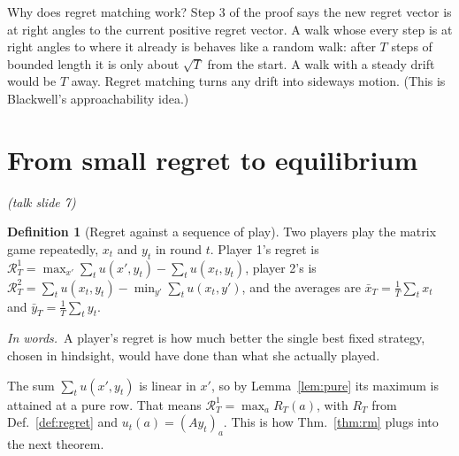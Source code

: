 \documentclass[11pt]{article}
\theoremstyle{definition}
\newtheorem{definition}{Definition}[section]
\newcommand{\inwords}{\par\smallskip\noindent\textit{In words.}\ }
\newcommand{\Def}[1]{Def.~\ref{#1}}\newcommand{\Lem}[1]{Lemma~\ref{#1}}\newcommand{\Thm}[1]{Thm.~\ref{#1}}
\newcommand{\slide}[1]{\hfill{\small\itshape (talk slide #1)}}
\begin{document}
\begin{intuition}
Why does regret matching work? Step 3 of the proof says the new regret vector is at right angles to the current positive
regret vector. A walk whose every step is at right angles to where it already is behaves like a random walk: after $T$
steps of bounded length it is only about $\sqrt T$ from the start. A walk with a steady drift would be $T$ away. Regret
matching turns any drift into sideways motion. (This is Blackwell's approachability idea.)
\end{intuition}

\section{From small regret to equilibrium}\label{sec:folk}\slide{7}
\begin{definition}[Regret against a sequence of play]\label{def:gameregret}
Two players play the matrix game repeatedly, $x_t$ and $y_t$ in round $t$. Player 1's regret is
$\mathcal R^1_T=\max_{x'}\sum_tu(x',y_t)-\sum_tu(x_t,y_t)$, player 2's is $\mathcal R^2_T=\sum_tu(x_t,y_t)-\min_{y'}\sum_tu(x_t,y')$,
and the averages are $\bar x_T=\tfrac1T\sum_tx_t$ and $\bar y_T=\tfrac1T\sum_ty_t$.
\inwords A player's regret is how much better the single best fixed strategy, chosen in hindsight, would have done than
what she actually played.
\end{definition}
The sum $\sum_tu(x',y_t)$ is linear in $x'$, so by \Lem{lem:pure} its maximum is attained at a pure row. That means
$\mathcal R^1_T=\max_aR_T(a)$, with $R_T$ from \Def{def:regret} and $u_t(a)=(Ay_t)_a$. This is how \Thm{thm:rm} plugs
into the next theorem.
\end{document}
